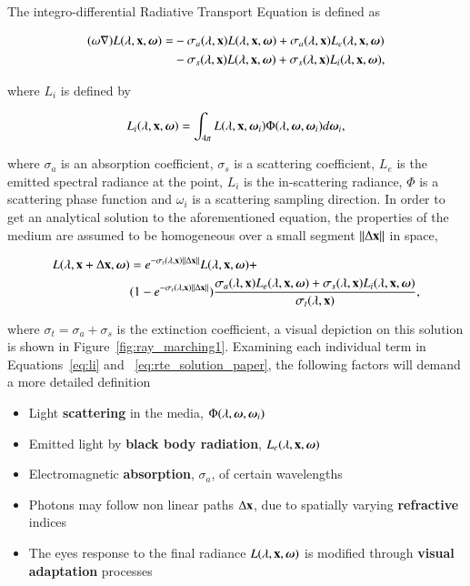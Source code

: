 The integro-differential Radiative Transport Equation is defined as

\begin{equation}
\begin{split}
(\omega \nabla) L(\lambda, \mathbf{x}, \boldsymbol{\omega}) = &- \sigma_a(\lambda, \mathbf{x}) L(\lambda, \mathbf{x}, \boldsymbol{\omega}) + \sigma_a(\lambda, \mathbf{x}) L_e(\lambda, \mathbf{x}, \boldsymbol{\omega}) \\
&- \sigma_s(\lambda, \mathbf{x}) L(\lambda, \mathbf{x}, \boldsymbol{\omega}) + \sigma_s(\lambda, \mathbf{x}) L_i(\lambda, \mathbf{x}, \boldsymbol{\omega}),
\end{split}
\end{equation}

where $L_i$ is defined by

\begin{equation}
\label{eq:li}
L_i(\lambda, \mathbf{x}, \boldsymbol{\omega}) = \int_{4 \pi} L(\lambda, \mathbf{x}, \boldsymbol{\omega}_i) \Phi (\lambda, \boldsymbol{\omega}, \boldsymbol{\omega}_i) d \boldsymbol{\omega}_i,
\end{equation}

where $\sigma_a$ is an absorption coefficient, $\sigma_s$ is a scattering coefficient, $L_e$ is the emitted spectral radiance at the point, $L_i$ is the in-scattering radiance, $\Phi$ is a scattering phase function and $\omega_i$ is a scattering sampling direction.
In order to get an analytical solution to the aforementioned equation, the properties of the medium are assumed to be homogeneous over a small segment $\left \| \Delta \mathbf{x} \right \|$ in space,

\begin{equation}
\label{eq:rte_solution_paper}
\begin{split}
L(\lambda, \mathbf{x} + \Delta\mathbf{x}, \boldsymbol{\omega}) &= e^{-\sigma_t(\lambda, \mathbf{x}) \left \| \Delta \mathbf{x} \right \|} L(\lambda, \mathbf{x}, \boldsymbol{\omega}) +  \\
& (1 - e^{-\sigma_t(\lambda, \mathbf{x}) \left \| \Delta \mathbf{x} \right \|} ) \frac{\sigma_a(\lambda, \mathbf{x}) L_e(\lambda, \mathbf{x}, \boldsymbol{\omega}) + \sigma_s(\lambda, \mathbf{x}) L_i(\lambda, \mathbf{x}, \boldsymbol{\omega})}{\sigma_t(\lambda, \mathbf{x})},
\end{split}
\end{equation}

where $\sigma_t = \sigma_a + \sigma_s$ is the extinction coefficient, a visual depiction on this solution is shown in Figure~\ref{fig:ray_marching1}.
Examining each individual term in Equations~\ref{eq:li} and ~\ref{eq:rte_solution_paper}, the following factors will demand a more detailed definition

\begin{itemize}
\item Light \textbf{scattering} in the media, $\Phi(\lambda, \boldsymbol{\omega}, \boldsymbol{\omega}_i)$
\item Emitted light by \textbf{black body radiation}, $L_e(\lambda, \mathbf{x}, \boldsymbol{\omega})$
\item Electromagnetic \textbf{absorption}, $\sigma_a$, of certain wavelengths 
\item Photons may follow non linear paths $\Delta\mathbf{x}$, due to spatially varying \textbf{refractive} indices
\item The eyes response to the final radiance $L(\lambda, \mathbf{x}, \boldsymbol{\omega})$ is modified through \textbf{visual adaptation} processes
\end{itemize}

